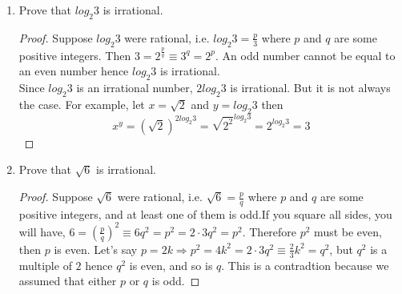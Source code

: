 \documentclass[11pt]{article}
\begin{document}

\section*{}
\begin{enumerate}
    \item  Prove that $log_{2}3$ is irrational.
    \begin{proof}
        Suppose $log_{2}3$ were rational, i.e. $log_{2}3 = \frac{p}{3}$ where $p$ and $q$ are some positive integers. Then $3 = 2^{\frac{p}{q}} \equiv 3^{q} = 2^{p}$. An odd number cannot be equal to an even number hence $log_{2}3$ is irrational. \\

        Since $log_{2}3$ is an irrational number, $2log_{2}3$ is irrational.
        But it is not always the case. For example, let $x = \sqrt{2}$ and $y=log_{2}3$ then
        \begin{equation}
            x^{y} = (\sqrt{2})^{2log_{2}3} = \sqrt{2^{2}}^{log_{2}3} = 2^{log_{2}3} = 3
        \end{equation}
    \end{proof}

    \item Prove that $\sqrt{6}$ is irrational.
    \begin{proof}
        Suppose $\sqrt{6}$ were rational, i.e. $\sqrt{6} = \frac{p}{q}$ where $p$ and $q$ are some positive integers, and at least one of them is odd.If you square all sides, you will have, $ 6 = (\frac{p}{q})^{2} \equiv 6q^{2} = p^{2} = 2\cdot3q^{2} = p^{2}$. Therefore $p^{2}$ must be even, then $p$ is even. Let's say $p=2k \Rightarrow p^{2} = 4k^{2} = 2\cdot 3q^{2} \equiv \frac{2}{3}k^{2} = q^{2}$, but $q^{2}$ is a multiple of $2$ hence $q^{2}$ is even, and so is $q$. This is a contradtion because we assumed that either $p$ or $q$ is odd.
    \end{proof}


\end{enumerate}
\end{document}
